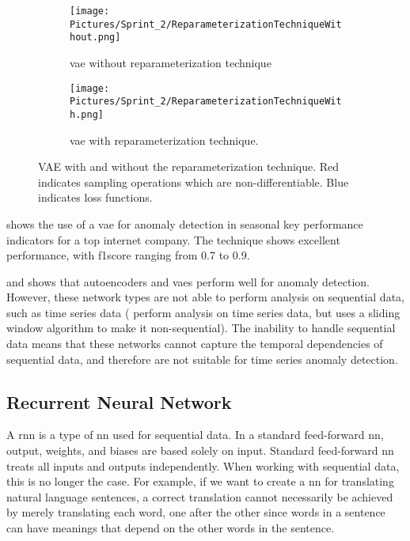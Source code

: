 \begin{figure}[htbp]
    \centering
    \begin{subfigure}{0.5\textwidth}
    \centering
    \texttt{[image: Pictures/Sprint\_2/ReparameterizationTechniqueWithout.png]}
    \caption*{\gls{vae} without reparameterization technique}
    \end{subfigure}%
    \begin{subfigure}{0.5\textwidth}
    \centering
    \texttt{[image: Pictures/Sprint\_2/ReparameterizationTechniqueWith.png]}
    \caption*{\gls{vae} with reparameterization technique.}
    \end{subfigure}%
\caption{VAE with and without the reparameterization technique. Red indicates sampling operations which are non-differentiable. Blue indicates loss functions.}\label{fig:vae:reparam}
\end{figure}

\cite{vae_anomaly_detection} shows the use of a \gls{vae} for anomaly detection in seasonal key performance indicators for a top internet company. The technique shows excellent performance, with \gls{f1score} ranging from 0.7 to 0.9.

\cite{hawkins_he_williams_baxter_2002} and \cite{vae_anomaly_detection} shows that autoencoders and \glspl{vae} perform well for anomaly detection. However, these network types are not able to perform analysis on sequential data, such as time series data (\cite{vae_anomaly_detection} perform analysis on time series data, but uses a sliding window algorithm to make it non-sequential). The inability to handle sequential data means that these networks cannot capture the temporal dependencies of sequential data, and therefore are not suitable for time series anomaly detection.

\subsection{Recurrent Neural Network}
A \gls{rnn} is a type of \gls{nn} used for sequential data. In a standard feed-forward \gls{nn}, output, weights, and biases are based solely on input. Standard feed-forward \gls{nn} treats all inputs and outputs independently. When working with sequential data, this is no longer the case. For example, if we want to create a \gls{nn} for translating natural language sentences, a correct translation cannot necessarily be achieved by merely translating each word, one after the other since words in a sentence can have meanings that depend on the other words in the sentence.\cite{rnn_tutorial}

